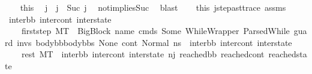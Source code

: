 \begin{isabellebody}
\ \ \isamarkupfalse%
\ this\ \isamarkupfalse%
\ j{\isacharprime}{\kern0pt}\ \ {\isachardoublequoteopen}j\ {\isacharequal}{\kern0pt}\ Suc\ j{\isacharprime}{\kern0pt}{\isachardoublequoteclose}\ \isamarkupfalse%
\ not{}{\isacharunderscore}{\kern0pt}implies{\isacharunderscore}{\kern0pt}Suc\ \isamarkupfalse%
\ blast\isanewline
\ \ \isamarkupfalse%
\ this\ j{\isacharunderscore}{\kern0pt}step{\isacharunderscore}{\kern0pt}ast{\isacharunderscore}{\kern0pt}trace\ assms{\isacharparenleft}{\kern0pt}{}{\isacharparenright}{\kern0pt}\ \isamarkupfalse%
\ inter{\isacharunderscore}{\kern0pt}bb\ inter{\isacharunderscore}{\kern0pt}cont\ inter{\isacharunderscore}{\kern0pt}state\ \isanewline
\ \ \ \ first{\isacharunderscore}{\kern0pt}step{\isacharcolon}{\kern0pt}\ {\isachardoublequoteopen}M{\isacharcomma}{\kern0pt}{\isasymLambda}{\isacharcomma}{\kern0pt}{\isasymGamma}{\isacharcomma}{\kern0pt}{\isasymOmega}{\isacharcomma}{\kern0pt}T\ {\isasymturnstile}\ {\isasymlangle}{\isacharparenleft}{\kern0pt}{\isacharparenleft}{\kern0pt}BigBlock\ name\ cmds\ {\isacharparenleft}{\kern0pt}Some\ {\isacharparenleft}{\kern0pt}WhileWrapper\ {\isacharparenleft}{\kern0pt}ParsedWhile\ guard\ invs\ {\isacharparenleft}{\kern0pt}body{\isacharunderscore}{\kern0pt}bb{}{\isacharhash}{\kern0pt}body{\isacharunderscore}{\kern0pt}bbs{\isacharparenright}{\kern0pt}{\isacharparenright}{\kern0pt}{\isacharparenright}{\kern0pt}{\isacharparenright}{\kern0pt}\ None{\isacharparenright}{\kern0pt}{\isacharcomma}{\kern0pt}\ cont{}{\isacharcomma}{\kern0pt}\ Normal\ ns{}{\isacharparenright}{\kern0pt}{\isasymrangle}\ {\isasymlongrightarrow}\ {\isacharparenleft}{\kern0pt}inter{\isacharunderscore}{\kern0pt}bb{\isacharcomma}{\kern0pt}\ inter{\isacharunderscore}{\kern0pt}cont{\isacharcomma}{\kern0pt}\ inter{\isacharunderscore}{\kern0pt}state{\isacharparenright}{\kern0pt}{\isachardoublequoteclose}\ \ \isanewline
\ \ \ \ rest{\isacharcolon}{\kern0pt}\ {\isachardoublequoteopen}M{\isacharcomma}{\kern0pt}{\isasymLambda}{\isacharcomma}{\kern0pt}{\isasymGamma}{\isacharcomma}{\kern0pt}{\isasymOmega}{\isacharcomma}{\kern0pt}T\ {\isasymturnstile}\ {\isacharparenleft}{\kern0pt}inter{\isacharunderscore}{\kern0pt}bb{\isacharcomma}{\kern0pt}\ inter{\isacharunderscore}{\kern0pt}cont{\isacharcomma}{\kern0pt}\ inter{\isacharunderscore}{\kern0pt}state{\isacharparenright}{\kern0pt}\ {\isacharminus}{\kern0pt}n{\isasymlongrightarrow}{\isacharcircum}{\kern0pt}j{\isacharprime}{\kern0pt}\ {\isacharparenleft}{\kern0pt}reached{\isacharunderscore}{\kern0pt}bb{\isacharcomma}{\kern0pt}\ reached{\isacharunderscore}{\kern0pt}cont{\isacharcomma}{\kern0pt}\ reached{\isacharunderscore}{\kern0pt}state{\isacharparenright}{\kern0pt}{\isachardoublequoteclose}\isanewline

\end{isabellebody}
